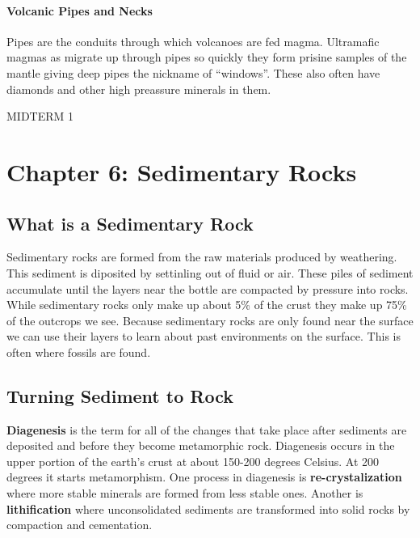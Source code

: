 \documentclass{article}
\begin{document}
\paragraph{Volcanic Pipes and Necks} %
\label{par:volcanic_pipes_and_necks}
Pipes are the conduits through which volcanoes are fed magma. Ultramafic magmas as migrate up through pipes so quickly they form prisine samples of the mantle giving deep pipes the nickname of ``windows''. These also often have diamonds and other high preassure minerals in them.


\newpage
MIDTERM 1
\newpage
\section*{Chapter 6: Sedimentary Rocks} %
\label{sec:chapter_6_sedimentary_rocks}
\subsection*{What is a Sedimentary Rock} %
\label{sub:what_is_a_sedimentary_rock}
Sedimentary rocks are formed from the raw materials produced by weathering. This sediment is diposited by settinling out of fluid or air. These piles of sediment accumulate until the layers near the bottle are compacted by pressure into rocks. While sedimentary rocks only make up about 5\% of the crust they make up 75\% of the outcrops we see. Because sedimentary rocks are only found near the surface we can use their layers to learn about past environments on the surface. This is often where fossils are found.

\subsection*{Turning Sediment to Rock} %
\label{sub:turning_sediment_to_rock}
\textbf{Diagenesis} is the term for all of the changes that take place after sediments are deposited and before they become metamorphic rock. Diagenesis occurs in the upper portion of the earth's crust at about 150-200 degrees Celsius. At 200 degrees it starts metamorphism. One process in diagenesis is \textbf{re-crystalization} where more stable minerals are formed from less stable ones. Another is \textbf{lithification} where unconsolidated sediments are transformed into solid rocks by compaction and cementation.
\end{document}
